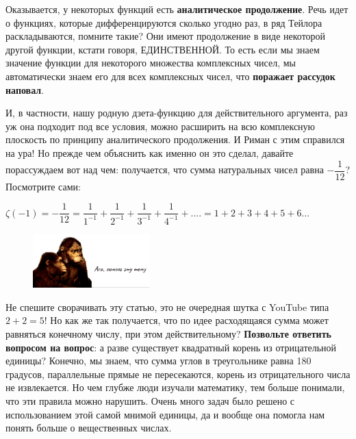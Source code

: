 \hspace{20}Оказывается, у некоторых функций есть \textbf{аналитическое продолжение}. Речь идет о функциях, которые дифференцируются сколько угодно раз, в ряд Тейлора раскладываются, помните такие? Они имеют продолжение в виде некоторой другой функции, кстати говоря, ЕДИНСТВЕННОЙ. То есть если мы знаем значение функции для некоторого множества комплексных чисел, мы автоматически знаем его для всех комплексных чисел, что \textbf{поражает рассудок наповал}. 

\hspace{20}И, в частности, нашу родную дзета-функцию для действительного аргумента, раз уж она подходит под все условия, можно расширить на всю комплексную плоскость по принципу аналитического продолжения. И Риман с этим справился на ура! 
Но прежде чем объяснить как именно он это сделал, давайте порассуждаем вот над чем: получается, что сумма натуральных чисел равна $-\dfrac{1}{12}$? Посмотрите сами:
\newline 
\centerline{$\zeta(-1)=-\dfrac{1}{12}=\dfrac{1}{1^{-1}}+\dfrac{1}{2^{-1}}+\dfrac{1}{3^{-1}}+\dfrac{1}{4^{-1}}+....= 1+2+3+4+5+6...$ }

\newline \hspace{20}
\begin{figure}
 \vspace{-10pt}
  \begin{center}
    \includegraphics[width=0.4\textwidth]{primates.png}
  \end{center}
   \vspace{-25pt}
\end{figure}
\hspace{20}

\hspace{20}Не спешите сворачивать эту статью, это не очередная шутка с YouTube типа $2+2=5$! Но как же так получается, что по идее расходящаяся сумма может равняться конечному числу, при этом действительному? \textbf{Позвольте ответить вопросом на вопрос}: а разве существует квадратный корень из отрицательной единицы? Конечно, мы знаем, что сумма углов в треугольнике равна 180 градусов, параллельные прямые не пересекаются, корень из отрицательного числа не извлекается. Но чем глубже люди изучали математику, тем больше понимали, что эти правила можно нарушить. Очень много задач было решено с использованием этой самой мнимой единицы, да и вообще она помогла нам понять больше о вещественных числах.


